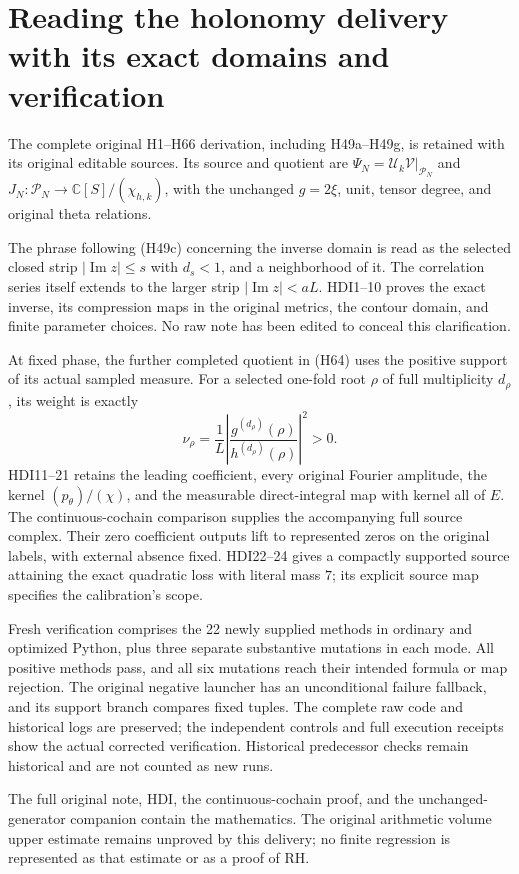 \section{Reading the holonomy delivery with its exact domains and verification}
The complete original H1--H66 derivation, including H49a--H49g,
is retained with its original editable sources. Its source and
quotient are \(\Psi_N=\mathcal U_k\mathcal V|_{\mathcal P_N}\)
and \(J_N:\mathcal P_N\to\mathbb C[S]/(\chi_{h,k})\), with
the unchanged \(g=2\xi\), unit, tensor degree, and original
theta relations.

The phrase following (H49c) concerning the inverse domain is read
as the selected closed strip \(|\operatorname{Im}z|\le s\)
with \(d_s<1\), and a neighborhood of it. The correlation
series itself extends to the larger strip
\(|\operatorname{Im}z|<aL\). HDI1--10 proves the exact inverse,
its compression maps in the original metrics, the contour
domain, and finite parameter choices. No raw note has been
edited to conceal this clarification.

At fixed phase, the further completed quotient in (H64) uses the
positive support of its actual sampled measure. For a selected
one-fold root \(\rho\) of full multiplicity \(d_\rho\), its weight
is exactly
\[
 \nu_\rho=\frac1L\left|
 \frac{g^{(d_\rho)}(\rho)}{h^{(d_\rho)}(\rho)}
 \right|^2>0.
\]
HDI11--21 retains the leading coefficient, every original
Fourier amplitude, the kernel \((p_\theta)/(\chi)\), and the
measurable direct-integral map with kernel all of \(E\).
The continuous-cochain comparison supplies the accompanying
full source complex. Their zero coefficient outputs lift to
represented zeros on the original labels, with external
absence fixed. HDI22--24 gives a compactly supported source
attaining the exact quadratic loss with literal mass \(7\);
its explicit source map specifies the calibration's scope.

Fresh verification comprises the 22 newly supplied methods in
ordinary and optimized Python, plus three separate substantive
mutations in each mode. All positive methods pass, and all six
mutations reach their intended formula or map rejection.
The original negative launcher has an unconditional failure
fallback, and its support branch compares fixed tuples.
The complete raw code and historical logs are preserved;
the independent controls and full execution receipts show
the actual corrected verification. Historical predecessor
checks remain historical and are not counted as new runs.

The full original note, HDI, the continuous-cochain proof,
and the unchanged-generator companion contain the mathematics.
The original arithmetic volume upper estimate remains
unproved by this delivery; no finite regression is represented
as that estimate or as a proof of RH.
